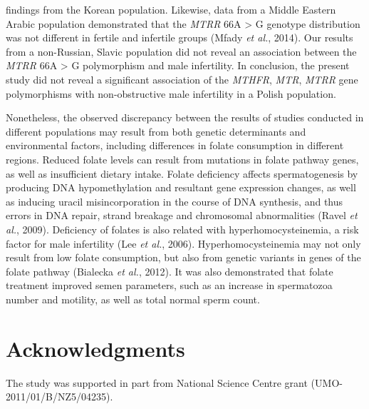 findings from the Korean population. Likewise, data from a Middle Eastern Arabic population demonstrated that the \textit{MTRR} 66A > G genotype distribution was not different in fertile and infertile groups (Mfady \textit{et al.}, 2014). Our results from a non-Russian, Slavic population did not reveal an association between the \textit{MTRR} 66A > G polymorphism and male infertility. In conclusion, the present study did not reveal a significant association of the \textit{MTHFR}, \textit{MTR}, \textit{MTRR} gene polymorphisms with non-obstructive male infertility in a Polish population.\par Nonetheless, the observed discrepancy between the results of studies conducted in different populations may result from both genetic determinants and environmental factors, including differences in folate consumption in different regions. Reduced folate levels can result from mutations in folate pathway genes, as well as insufficient dietary intake. Folate deficiency affects spermatogenesis by producing DNA hypomethylation and resultant gene expression changes, as well as inducing uracil misincorporation in the course of DNA synthesis, and thus errors in DNA repair, strand breakage and chromosomal abnormalities (Ravel \textit{et al.}, 2009). Deficiency of folates is also related with hyperhomocysteinemia, a risk factor for male infertility (Lee \textit{et al.}, 2006). Hyperhomocysteinemia may not only result from low folate consumption, but also from genetic variants in genes of the folate pathway (Bialecka \textit{et al.}, 2012). It was also demonstrated that folate treatment improved semen parameters, such as an increase in spermatozoa number and motility, as well as total normal sperm count.
\section*{Acknowledgments}
\par The study was supported in part from National Science Centre grant (UMO-2011/01/B/NZ5/04235).


